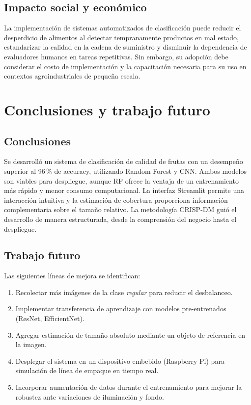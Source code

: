 \documentclass[conference]{IEEEtran}
\begin{document}
\subsection{Impacto social y económico}
La implementación de sistemas automatizados de clasificación puede reducir el desperdicio de alimentos al detectar tempranamente productos en mal estado, estandarizar la calidad en la cadena de suministro y disminuir la dependencia de evaluadores humanos en tareas repetitivas. Sin embargo, su adopción debe considerar el costo de implementación y la capacitación necesaria para su uso en contextos agroindustriales de pequeña escala.

\section{Conclusiones y trabajo futuro}

\subsection{Conclusiones}
Se desarrolló un sistema de clasificación de calidad de frutas con un desempeño superior al 96\,\% de accuracy, utilizando Random Forest y CNN. Ambos modelos son viables para despliegue, aunque RF ofrece la ventaja de un entrenamiento más rápido y menor consumo computacional. La interfaz Streamlit permite una interacción intuitiva y la estimación de cobertura proporciona información complementaria sobre el tamaño relativo. La metodología CRISP-DM guió el desarrollo de manera estructurada, desde la comprensión del negocio hasta el despliegue.

\subsection{Trabajo futuro}
Las siguientes líneas de mejora se identifican:
\begin{enumerate}
  \item Recolectar más imágenes de la clase \emph{regular} para reducir el desbalanceo.
  \item Implementar transferencia de aprendizaje con modelos pre-entrenados (ResNet, EfficientNet).
  \item Agregar estimación de tamaño absoluto mediante un objeto de referencia en la imagen.
  \item Desplegar el sistema en un dispositivo embebido (Raspberry Pi) para simulación de línea de empaque en tiempo real.
  \item Incorporar aumentación de datos durante el entrenamiento para mejorar la robustez ante variaciones de iluminación y fondo.
\end{enumerate}
\end{document}
